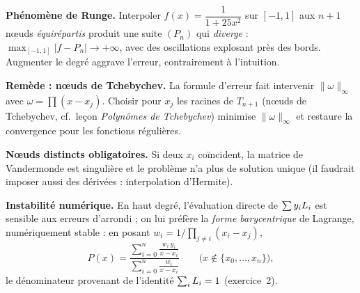 \vspace{6pt}

\begin{mdframed}[style=cexbar]
  \textbf{Phénomène de Runge.}\enspace{}
  Interpoler $f(x)=\dfrac{1}{1+25x^2}$ sur $[-1,1]$ aux $n+1$ nœuds
  \emph{équirépartis} produit une suite $(P_n)$ qui \emph{diverge} :
  $\max_{[-1,1]}|f-P_n| \to +\infty$, avec des oscillations explosant près
  des bords. Augmenter le degré aggrave l'erreur, contrairement à
  l'intuition.

  \smallskip\noindent
  \textbf{Remède : nœuds de Tchebychev.}\enspace{}
  La formule d'erreur fait intervenir $\|\omega\|_\infty$ avec
  $\omega = \prod (x-x_j)$. Choisir pour $x_j$ les racines de $T_{n+1}$
  (nœuds de Tchebychev, cf.\ leçon \emph{Polynômes de Tchebychev})
  minimise $\|\omega\|_\infty$ et restaure la convergence pour les
  fonctions régulières.

  \smallskip\noindent
  \textbf{Nœuds distincts obligatoires.}\enspace
  Si deux $x_i$ coïncident, la matrice de Vandermonde est singulière et le
  problème n'a plus de solution unique (il faudrait imposer aussi des
  dérivées : interpolation d'Hermite).

  \smallskip\noindent
  \textbf{Instabilité numérique.}\enspace
  En haut degré, l'évaluation directe de $\sum y_i L_{i}$ est sensible
  aux erreurs d'arrondi ; on lui préfère la \emph{forme barycentrique} de
  Lagrange, numériquement stable : en posant
  $w_i = 1/\prod_{j\neq i}(x_i-x_j)$,
  \[
    P(x) = \frac{\displaystyle\sum_{i=0}^{n} \frac{w_i\,y_i}{x-x_i}}
                {\displaystyle\sum_{i=0}^{n} \frac{w_i}{x-x_i}}
    \qquad \bigl(x \notin \{x_0,\ldots,x_n\}\bigr),
  \]
  le dénominateur provenant de l'identité $\sum_i L_{i} = 1$
  (exercice~2).
\end{mdframed}

\vspace{6pt}
\exolabel

